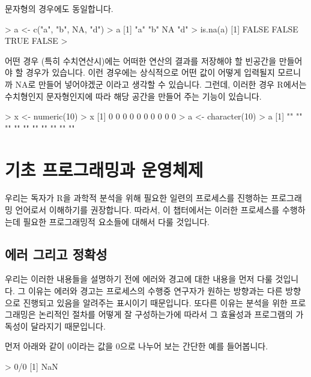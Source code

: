 \documentclass{book}
\begin{document}
문자형의 경우에도 동일합니다. 

\begin{Schunk}
\begin{Soutput}
> a <- c("a", "b", NA, "d")
> a
[1] "a" "b" NA  "d"
> is.na(a)
[1] FALSE FALSE  TRUE FALSE
> 
\end{Soutput}
\end{Schunk}


어떤 경우 (특히 수치연산시)에는 어떠한 연산의 결과를 저장해야 할 빈공간을 만들어야 할 경우가 있습니다.
이런 경우에는 상식적으로 어떤 값이 어떻게 입력될지 모르니까 NA로 만들어 넣어야겠군 이라고 생각할 수 있습니다. 
그런데, 이러한 경우 R에서는 수치형인지 문자형인지에 따라 해당 공간을 만들어 주는 기능이 있습니다. 

\begin{Schunk}
\begin{Soutput}
> x <- numeric(10)
> x
 [1] 0 0 0 0 0 0 0 0 0 0
> a <- character(10)
> a
 [1] "" "" "" "" "" "" "" "" "" ""
\end{Soutput}
\end{Schunk}

\chapter{기초 프로그래밍과 운영체제}

우리는 독자가 R을 과학적 분석을 위해 필요한 일련의 프로세스를 진행하는 프로그래밍 언어로서 이해하기를 권장합니다.
따라서, 이 챕터에서는 이러한 프로세스를 수행하는데 필요한 프로그래밍적 요소들에 대해서 다룰 것입니다. 


\section{에러 그리고 정확성}

우리는 이러한 내용들을 설명하기 전에 에러와 경고에 대한 내용을 먼저 다룰 것입니다. 
그 이유는 에러와 경고는 프로세스의 수행중 연구자가 원하는 방향과는 다른 방향으로 진행되고 있음을 알려주는 표시이기 때문입니다. 
또다른 이유는 분석을 위한 프로그래밍은 논리적인 절차를 어떻게 잘 구성하는가에 따라서 그 효율성과 프로그램의 가독성이 달라지기 때문입니다. 

먼저 아래와 같이 0이라는 값을 0으로 나누어 보는 간단한 예를 들어봅니다. 

\begin{Schunk}
\begin{Soutput}
> 0/0
[1] NaN
\end{Soutput}
\end{Schunk}
\end{document}
